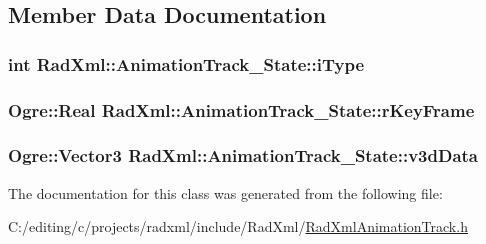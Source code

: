 \subsection{Member Data Documentation}
\hypertarget{class_rad_xml_1_1_animation_track___state_acc0cc16343e14e9a027fe916c241212e}{
\subsubsection[{i\-Type}]{\setlength{\rightskip}{0pt plus 5cm}int Rad\-Xml\-::\-Animation\-Track\-\_\-\-State\-::i\-Type}}\label{class_rad_xml_1_1_animation_track___state_acc0cc16343e14e9a027fe916c241212e}
\hypertarget{class_rad_xml_1_1_animation_track___state_aedc36ab34700b6a011ab75d58483cf6b}{
\subsubsection[{r\-Key\-Frame}]{\setlength{\rightskip}{0pt plus 5cm}Ogre\-::\-Real Rad\-Xml\-::\-Animation\-Track\-\_\-\-State\-::r\-Key\-Frame}}\label{class_rad_xml_1_1_animation_track___state_aedc36ab34700b6a011ab75d58483cf6b}
\hypertarget{class_rad_xml_1_1_animation_track___state_a74048a1ea345ea44d46c9be8ecff73f6}{
\subsubsection[{v3d\-Data}]{\setlength{\rightskip}{0pt plus 5cm}Ogre\-::\-Vector3 Rad\-Xml\-::\-Animation\-Track\-\_\-\-State\-::v3d\-Data}}\label{class_rad_xml_1_1_animation_track___state_a74048a1ea345ea44d46c9be8ecff73f6}


The documentation for this class was generated from the following file\-:\begin{DoxyCompactItemize}
\item 
C\-:/editing/c/projects/radxml/include/\-Rad\-Xml/\hyperlink{_rad_xml_animation_track_8h}{Rad\-Xml\-Animation\-Track.\-h}\end{DoxyCompactItemize}
